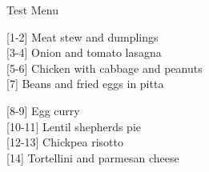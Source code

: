 
    
		\begin{menu}{Test Menu}
    
    \begin{recipelist}
    
        {\scriptsize[1-2]} Meat stew and dumplings\\
        {\scriptsize[3-4]} Onion and tomato lasagna\\
        {\scriptsize[5-6]} Chicken with cabbage and peanuts\\
        {\scriptsize[7]} Beans and fried eggs in pitta\\%
    \end{recipelist}%
    \begin{recipelist}
    
        {\scriptsize[8-9]} Egg curry\\
        {\scriptsize[10-11]} Lentil shepherds pie\\
        {\scriptsize[12-13]} Chickpea risotto\\
        {\scriptsize[14]} Tortellini and parmesan cheese\\%
    \end{recipelist}\par%
  

\end{menu}
